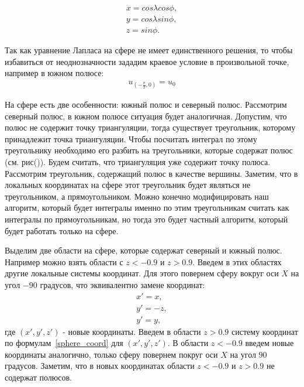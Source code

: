 \documentclass[a4paper]{article}
\begin{document}
\begin{equation}\label{sphere_coord}
\begin{split}
x = cos \lambda cos \phi, \\
y = cos \lambda sin \phi, \\
z = sin \phi. 
\end{split}
\end{equation}

Так как уравнение Лапласа на сфере не имеет единственного решения, то
чтобы избавиться от неоднозначности зададим краевое условие в
произвольной точке, например в южном полюсе:
\begin{equation*}
\begin{split}
u_{(-\frac{\pi}{2},0)}=u_0
\end{split}
\end{equation*} 

На сфере есть две особенности: южный полюс и северный
полюс. Рассмотрим северный полюс, в южном полюсе ситуация будет
аналогичная. Допустим, что полюс не содержит точку триангуляции, тогда
существует треугольник, которому принадлежит точка триангуляции. Чтобы
посчитать интеграл по этому треугольнику необходимо его разбить на
треугольники, которые содержат полюс (см. рис()). Будем считать,
что триангуляция уже содержит точку полюса. Рассмотрим треугольник,
содержащий полюс в качестве вершины. Заметим, что в локальных
координатах на сфере этот треугольник будет являться не треугольником,
а прямоугольником. Можно конечно модифицировать наш алгоритм, который
будет интегралы именно по этим треугольникам считать как интегралы по
прямоугольникам, но тогда это будет частный алгоритм, который будет
работать только на сфере. 

Выделим две области на сфере, которые содержат северный и южный
полюс. Например можно взять области с $z<-0.9$ и $z>0.9$. Введем в
этих областях другие локальные системы координат. Для этого повернем сферу
вокруг оси $X$ на угол $-90$ градусов, что эквивалентно замене координат:
\begin{equation*}
\begin{split}
x' = x,\\
y' = -z,\\
y' = y,
\end{split}
\end{equation*}
где $(x',y',z')$ - новые координаты. Введем в области $z>0.9$ систему
координат по формулам~\ref{sphere_coord} для $(x',y',z')$.
В области $z<-0.9$ введем новые координаты аналогично, только сферу
повернем покруг оси $X$ на угол $90$ градусов.
Заметим, что в новых координатах области $z<-0.9$ и $z>0.9$ не
содержат полюсов.
\end{document}

